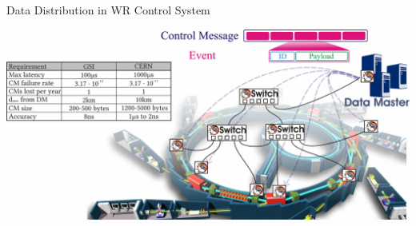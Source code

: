 \documentclass[compress,red]{beamer}
\begin{document}
\begin{frame}{Data Distribution in WR Control System}

    \begin{center}
    \includegraphics[width=1.1\textwidth]{applications/CERN/WRControlNetwork2.pdf}
    \end{center}


\end{frame}
\end{document}

